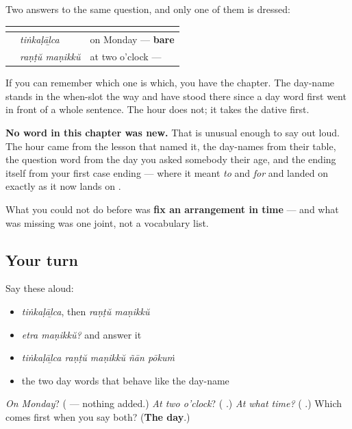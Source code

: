 \begin{grammarlens}[title={Grammar Lens: one of them takes an ending}]
Two answers to the same question, and only one of them is dressed:

\noindent
\begin{tabularx}{\linewidth}{@{}>{\raggedright\arraybackslash}X>{\raggedright\arraybackslash}X>{\raggedright\arraybackslash}X@{}}
\toprule
\textbf{} & \textbf{} & \textbf{} \\
\midrule
\textbf{\ml{തിങ്കളാഴ്ച}} & \emph{tiṅkaḷāḻca} & on Monday — \textbf{bare} \\
\textbf{\ml{രണ്ട്} \ml{മണിക്ക്}} & \emph{raṇṭŭ maṇikkŭ} & at two o'clock — \textbf{\ml{ക്ക്}} \\
\bottomrule
\end{tabularx}

If you can remember which one is which, you have the chapter. The day-name stands in the when-slot the way \textbf{} and \textbf{} have stood there since a day word first went in front of a whole sentence. The hour does not; it takes the dative first.
\end{grammarlens}

\begin{grammarlens}[title={What you've built}]
\textbf{No word in this chapter was new.} That is unusual enough to say out loud. The hour came from the lesson that named it, the day-names from their table, the question word from the day you asked somebody their age, and the ending itself from your first case ending — where it meant \emph{to} and \emph{for} and landed on \textbf{} exactly as it now lands on \textbf{}.

What you could not do before was \textbf{fix an arrangement in time} — and what was missing was one joint, not a vocabulary list.
\end{grammarlens}

\subsection*{Your turn}
Say these aloud:

\begin{itemize}
\raggedright
  \item \emph{tiṅkaḷāḻca}, then \emph{raṇṭŭ maṇikkŭ}
  \item \emph{etra maṇikkŭ?} and answer it
  \item \emph{tiṅkaḷāḻca raṇṭŭ maṇikkŭ ñān pōkuṁ}
  \item the two day words that behave like the day-name
\end{itemize}

\begin{tcolorbox}[breakable,colback=teal!4,colframe=teal!35!black,title={Before you move on}]
\emph{On Monday}? (\textbf{} — nothing added.) \emph{At two o'clock}? (\textbf{ }.) \emph{At what time?} (\textbf{ }.) Which comes first when you say both? (\textbf{The day}.)
\end{tcolorbox}
